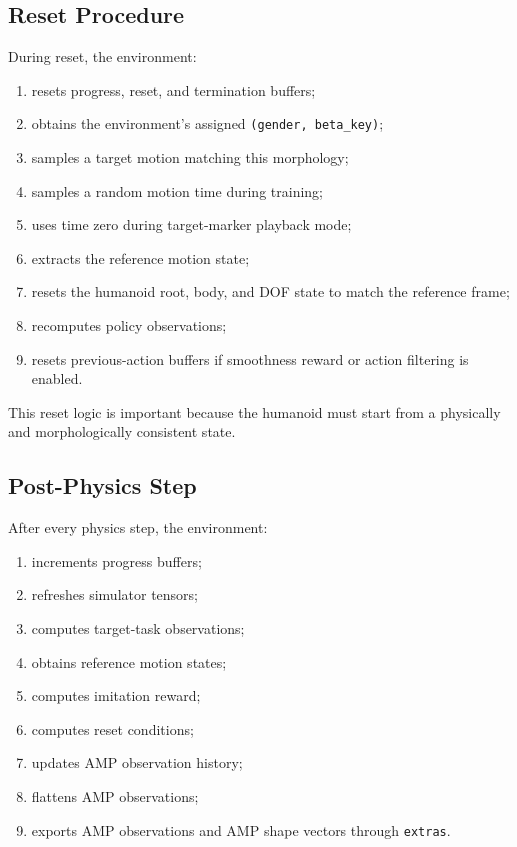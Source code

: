 \documentclass[11pt,a4paper]{article}
\begin{document}
\subsection{Reset Procedure}

During reset, the environment:

\begin{enumerate}[leftmargin=2em]
    \item resets progress, reset, and termination buffers;
    \item obtains the environment's assigned \texttt{(gender, beta\_key)};
    \item samples a target motion matching this morphology;
    \item samples a random motion time during training;
    \item uses time zero during target-marker playback mode;
    \item extracts the reference motion state;
    \item resets the humanoid root, body, and DOF state to match the reference frame;
    \item recomputes policy observations;
    \item resets previous-action buffers if smoothness reward or action filtering is enabled.
\end{enumerate}

This reset logic is important because the humanoid must start from a physically and morphologically consistent state.

\subsection{Post-Physics Step}

After every physics step, the environment:

\begin{enumerate}[leftmargin=2em]
    \item increments progress buffers;
    \item refreshes simulator tensors;
    \item computes target-task observations;
    \item obtains reference motion states;
    \item computes imitation reward;
    \item computes reset conditions;
    \item updates AMP observation history;
    \item flattens AMP observations;
    \item exports AMP observations and AMP shape vectors through \texttt{extras}.
\end{enumerate}
\end{document}
